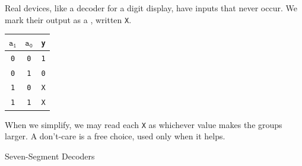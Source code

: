 \documentclass[mathserif, handout]{beamer}
\newcommand{\ttab}[1]{\texttt{#1}}
\begin{document}
\begin{frame}
  Real devices, like a decoder for a digit display, have inputs that never occur. We mark their output as a , written \ttab{X}.\\[4mm]
  \begin{center}
    \renewcommand{\arraystretch}{1.2}
    \begin{tabular}{cc|c}
      $\ttab{a}_{\ttab{1}}$ & $\ttab{a}_{\ttab{0}}$ & \ttab{y} \\ \hline
      \ttab{0} & \ttab{0} & \ttab{1} \\
      \ttab{0} & \ttab{1} & \ttab{0} \\
      \ttab{1} & \ttab{0} & \ttab{X} \\
      \ttab{1} & \ttab{1} & \ttab{X} \\
    \end{tabular}
  \end{center}
    When we simplify, we may read each \ttab{X} as whichever value makes the groups larger. A don't-care is a free choice, used only when it helps.
\end{frame}

\begin{frame}{Seven-Segment Decoders}
  \begin{center}
    \Large {}
  \end{center}
\end{frame}
\end{document}
